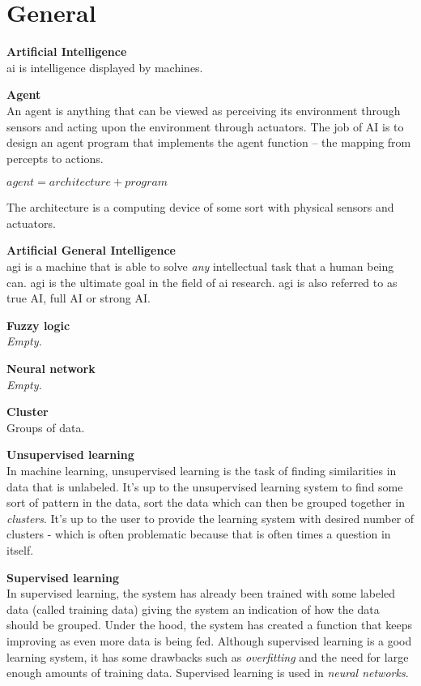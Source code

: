 \section{General}

\textbf{Artificial Intelligence} \\
\acrfull{ai} is intelligence displayed by machines. 

\textbf{Agent} \\
An agent is anything that can be viewed as perceiving its environment through sensors and acting upon the environment through actuators. The job of AI is to design an agent program that implements the agent function – the mapping from percepts to actions. \\
\centerline{$agent = architecture + program$}
The architecture is a computing device of some sort with physical sensors and actuators. 

\textbf{Artificial General Intelligence} \\
\acrfull{agi} is a machine that is able to solve \textit{any} intellectual task that a human being can. \acrshort{agi} is the ultimate goal in the field of \acrshort{ai} research. \acrshort{agi} is also referred to as true AI, full AI or strong AI. 

\textbf{Fuzzy logic} \\
\textit{Empty.}

\textbf{Neural network} \\
\textit{Empty.}

\textbf{Cluster} \\
Groups of data.

\textbf{Unsupervised learning} \\
In machine learning, unsupervised learning is the task of finding similarities in data that is unlabeled. It's up to the unsupervised learning system to find some sort of pattern in the data, sort the data which can then be grouped together in \textit{clusters}. It's up to the user to provide the learning system with desired number of clusters - which is often problematic because that is often times a question in itself. 


\textbf{Supervised learning} \\
In supervised learning, the system has already been trained with some labeled data (called training data) giving the system an indication of how the data should be grouped. Under the hood, the system has created a function that keeps improving as even more data is being fed. Although supervised learning is a good learning system, it has some drawbacks such as \textit{overfitting} and the need for large enough amounts of training data. Supervised learning is used in \textit{neural networks}. 


